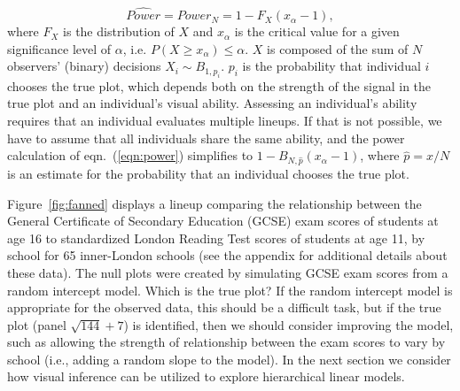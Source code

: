 \documentclass{article} %
\begin{document}
{\begin{equation}\label{eqn:power}
\widehat{Power} = {Power}_{N} = 1 - F_{X} (x_{\alpha} - 1),
\end{equation}
where $F_X$ is the distribution of $X$ and $x_\alpha$ is the critical value for a given significance level of $\alpha$, i.e. $P(X \ge x_{\alpha}) \le \alpha$. $X$ is composed of the sum of $N$ observers' (binary) decisions $X_i \sim B_{1, p_i}$.  $p_i$ is the probability that individual $i$ chooses the true plot, which  depends both on the strength of the signal in the true plot and an individual's visual ability.
Assessing an individual's ability requires that an individual evaluates multiple lineups. If that is not possible, we have to assume that all individuals share the same ability, and the power calculation of eqn.~(\ref{eqn:power}) simplifies to $1 - B_{N, \hat{p}}(x_\alpha-1)$, where $\widehat{p} = x/N$ is an estimate for the probability that an individual chooses the true plot.

}

Figure~\ref{fig:fanned} displays a lineup comparing the relationship between the  General Certificate of Secondary Education (GCSE) exam scores of students at age 16 to  standardized London Reading Test scores of students at age 11, by school for 65 inner-London schools (see the appendix for additional details about these data). The null plots were created by simulating GCSE exam scores from a random intercept model. Which is the true plot? If the random intercept model is appropriate for the observed data, this should be a difficult task, but if the true plot (panel $\sqrt{144} + 7$) is identified, then we should consider improving the model, such as allowing the strength of relationship between the exam scores to vary by school (i.e., adding a random slope to the model). In the next section we consider how visual inference can be utilized to explore hierarchical linear models.
\end{document}
